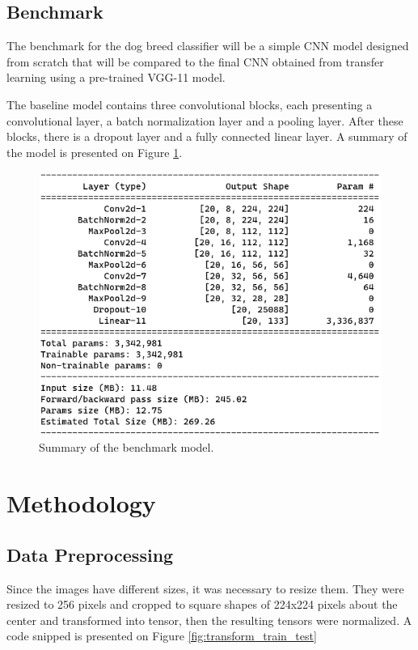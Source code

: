 \documentclass{article}
\begin{document}
    \subsection{Benchmark}
    
    The benchmark for the dog breed classifier will be a simple CNN model designed from scratch that will be compared to the final CNN obtained from transfer learning using a pre-trained VGG-11 model.
    
    The baseline model contains three convolutional blocks, each presenting a convolutional layer, a batch normalization layer and a pooling layer. After these blocks, there is a dropout layer and a fully connected linear layer. A summary of the model is presented on Figure \ref*{fig:model_summary}.
    
    \begin{figure}[htbp]
        \centering
        \includegraphics{img/model_summary.png}
        \caption{Summary of the benchmark model.}
        \label{fig:model_summary}
    \end{figure}
    
    \section{Methodology}

    \subsection{Data Preprocessing}

    Since the images have different sizes, it was necessary to resize them. They were resized to 256 pixels and cropped to square shapes of 224x224 pixels about the center and transformed into tensor, then the resulting tensors were normalized. A code snipped is presented on Figure \ref*{fig:transform_train_test}
\end{document}
